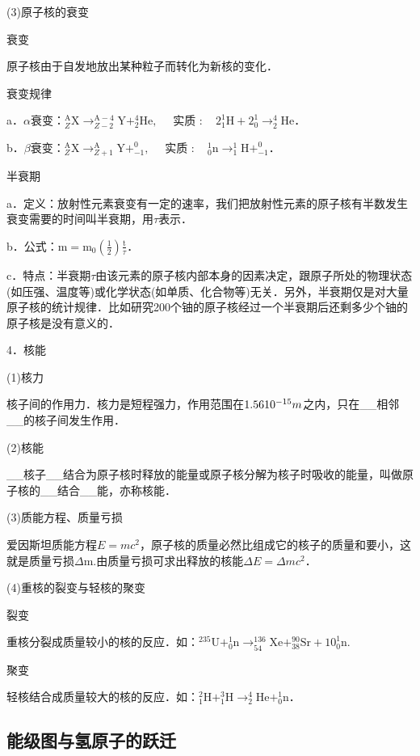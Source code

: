 (3)原子核的衰变

衰变

原子核由于自发地放出某种粒子而转化为新核的变化．

衰变规律

a．$\alpha$衰变：$_{Z}^{\mathrm{A}} \mathrm{X} \rightarrow_{Z-2}^{\mathrm{A}-4} \mathrm{Y}+_{2}^{4} \mathrm{He}, \quad$ 实质 $: \quad 2_{1}^{1} \mathrm{H}+2_{0}^{1} \rightarrow_{2}^{4} \mathrm{He}$．

b．$\beta$衰变：$_{Z}^{\mathrm{A}} \mathrm{X} \rightarrow_{Z+1}^{\mathrm{A}} \mathrm{Y}+_{-1}^{0}, \quad$ 实质 $: \quad_{0}^{1} \mathrm{n} \rightarrow_{1}^{1} \mathrm{H}+_{-1}^{0}$．

半衰期

a．定义：放射性元素衰变有一定的速率，我们把放射性元素的原子核有半数发生衰变需要的时间叫半衰期，用$\tau$表示．

b．公式：$\mathrm{m}=\mathrm{m}_{0}\left(\frac{1}{2}\right) \frac{\mathrm{t}}{\tau}$．

c．特点：半衰期$\tau$由该元素的原子核内部本身的因素决定，跟原子所处的物理状态(如压强、温度等)或化学状态(如单质、化合物等)无关．另外，半衰期仅是对大量原子核的统计规律．比如研究200个铀的原子核经过一个半衰期后还剩多少个铀的原子核是没有意义的．

4．核能

(1)核力

核子间的作用力．核力是短程强力，作用范围在$1.5\ding{54}10^{-15}m$之内，只在\_\_相邻\_\_的核子间发生作用．

(2)核能

\_\_核子\_\_结合为原子核时释放的能量或原子核分解为核子时吸收的能量，叫做原子核的\_\_结合\_\_能，亦称核能．

(3)质能方程、质量亏损

爱因斯坦质能方程$E=mc^2$，原子核的质量必然比组成它的核子的质量和要小，这就是质量亏损$\Delta$m.由质量亏损可求出释放的核能$\Delta E= \Delta mc^2$．

(4)重核的裂变与轻核的聚变

裂变

重核分裂成质量较小的核的反应．如：$^{235} \mathrm{U}+_{0}^{1} \mathrm{n} \rightarrow_{54}^{136} \mathrm{Xe}+_{38}^{90} \mathrm{Sr}+10_{0}^{1} \mathrm{n}$.　

聚变

轻核结合成质量较大的核的反应．如：$_{1}^{2} \mathrm{H}+_{1}^{3} \mathrm{H} \rightarrow_{2}^{4} \mathrm{He}+_{0}^{1} \mathrm{n}$．
\newpage
\subsection{能级图与氢原子的跃迁}

